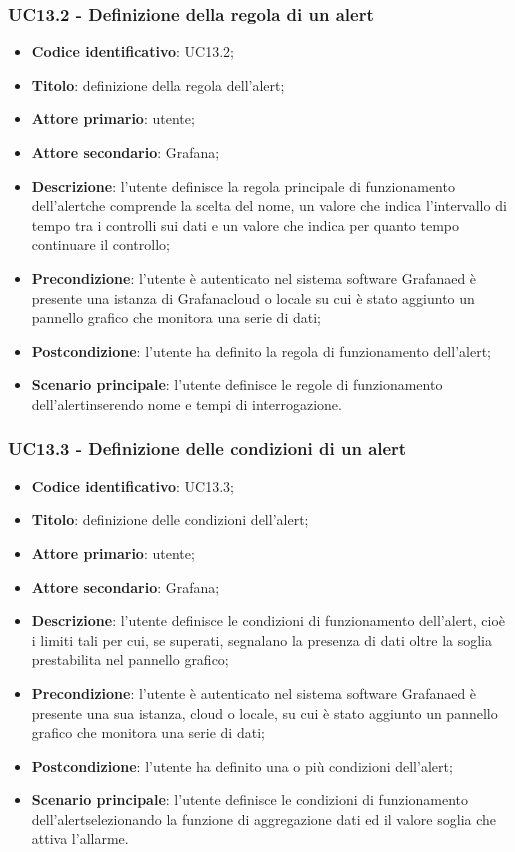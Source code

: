 \subsubsection{UC13.2 - Definizione della regola di un alert}
\begin{itemize}
	\item \textbf{Codice identificativo}: UC13.2;
	\item \textbf{Titolo}: definizione della regola dell'alert\glo;
	\item \textbf{Attore primario}: utente;
	\item \textbf{Attore secondario}: Grafana\glo;
	\item \textbf{Descrizione}: l'utente definisce la regola principale di funzionamento dell'alert\glosp che comprende la scelta del nome, un valore che indica l'intervallo di tempo tra i controlli sui dati e un valore che indica per quanto tempo continuare il controllo;
	\item \textbf{Precondizione}: l'utente è autenticato nel sistema software Grafana\glosp ed è presente una istanza di Grafana\glosp cloud o locale su cui è stato aggiunto un pannello grafico che monitora una serie di dati;
	\item \textbf{Postcondizione}: l'utente ha definito la regola di funzionamento dell'alert\glo;
	\item \textbf{Scenario principale}: l'utente definisce le regole di funzionamento dell'alert\glosp inserendo nome e tempi di interrogazione.
\end{itemize}

\subsubsection{UC13.3 - Definizione delle condizioni di un alert}
\begin{itemize}
	\item \textbf{Codice identificativo}: UC13.3;
	\item \textbf{Titolo}: definizione delle condizioni dell'alert\glo;
	\item \textbf{Attore primario}: utente;
	\item \textbf{Attore secondario}: Grafana\glo;
	\item \textbf{Descrizione}: l'utente definisce le condizioni di funzionamento dell'alert\glo, cioè i limiti tali per cui, se superati, segnalano la presenza di dati oltre la soglia prestabilita nel pannello grafico;
	\item \textbf{Precondizione}: l'utente è autenticato nel sistema software Grafana\glosp ed è presente una sua istanza, cloud o locale, su cui è stato aggiunto un pannello grafico che monitora una serie di dati;
	\item \textbf{Postcondizione}: l'utente ha definito una o più condizioni dell'alert\glo;
	\item \textbf{Scenario principale}: l'utente definisce le condizioni di funzionamento dell'alert\glosp selezionando la funzione di aggregazione dati ed il valore soglia che attiva l'allarme.
\end{itemize}


